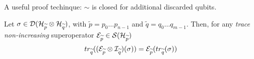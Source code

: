 A useful proof techinque: $\sim$ is closed for additional discarded qubits. 

\newcommand{\discQ}{disc(\widetilde{q})}
\newcommand{\trQ}{tr_{\widetilde{q}}}

\begin{lemma}\label{trace_and_sop}
Let $\sigma \in  \mathcal{D}(\mathcal{H}_{\widetilde{p}} \otimes \mathcal{H}_{\widetilde{q}})$, with $\widetilde{p} = p_0 \ldots p_{n-1}$ and $\widetilde{q} = q_0 \ldots q_{m-1}$. Then, for any \textit{trace non-increasing} superoperator $\mathcal{E}_{\widetilde{p}} \in \mathcal{S}(\mathcal{H}_{\widetilde{p}})$
\[ \trQ((\sop_{\widetilde{p}} \otimes \mathcal{I}_{\widetilde{q}})(\sigma)) = \sop_{\widetilde{p}}(\trQ(\sigma))
\]
\end{lemma}
